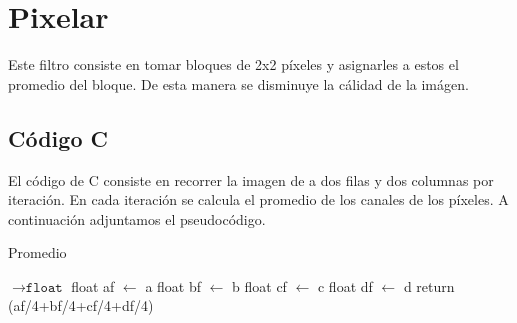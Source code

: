 \section{Pixelar}
Este filtro consiste en tomar bloques de 2x2 píxeles y asignarles a estos el promedio del bloque. De esta manera se disminuye la cálidad de la imágen.
\subsection{Código C}
	El código de C consiste en recorrer la imagen de a dos filas y dos columnas por iteración. En cada iteración se calcula el promedio de los canales de los píxeles.
	A continuación adjuntamos el pseudocódigo.

\begin{algorithm}[h!]
\caption{Promedio}
\begin{algorithmic}
    $\to \texttt{float}$
	\State float af $\gets$ a
	\State float bf $\gets$ b
	\State float cf $\gets$ c
	\State float df $\gets$ d
	return (af/4+bf/4+cf/4+df/4)
	
\EndFunction
\end{algorithmic} 
\end{algorithm}	
	
